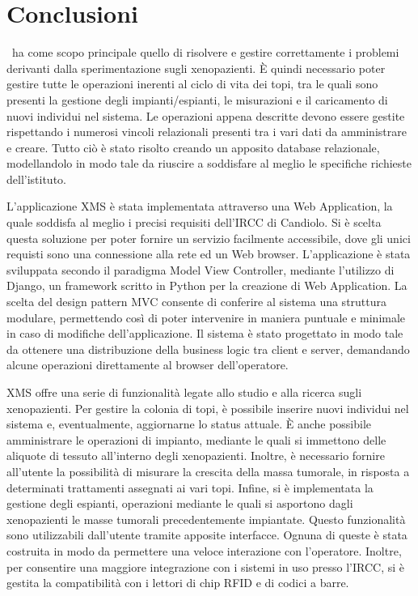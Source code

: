 \chapter{Conclusioni}\label{chap:xenoconcl}

\Xeno\ ha come scopo principale quello di risolvere e gestire correttamente i problemi derivanti dalla sperimentazione sugli xenopazienti. \`E quindi necessario poter gestire tutte le operazioni inerenti al ciclo di vita dei topi, tra le quali sono presenti la gestione degli impianti/espianti, le misurazioni e il caricamento di nuovi individui nel sistema. Le operazioni appena descritte devono essere gestite rispettando i numerosi vincoli relazionali presenti tra i vari dati da amministrare e creare. Tutto ci\`o \`e stato risolto creando un apposito database relazionale, modellandolo in modo tale da riuscire a soddisfare al meglio le specifiche richieste dell'istituto.

L'applicazione XMS \`e stata implementata attraverso una Web Application, la quale soddisfa al meglio i precisi requisiti dell'IRCC di Candiolo. Si \`e scelta questa soluzione per poter fornire un servizio facilmente accessibile, dove gli unici requisti sono una connessione alla rete ed un Web browser. L'applicazione \`e stata sviluppata secondo il paradigma Model View Controller, mediante l'utilizzo di Django, un framework scritto in Python per la creazione di Web Application. La scelta del design pattern MVC consente di conferire al sistema una struttura modulare, permettendo cos\`i di poter intervenire in maniera puntuale e minimale in caso di modifiche dell'applicazione. Il sistema \`e stato progettato in modo tale da ottenere una distribuzione della business logic tra client e server, demandando alcune operazioni direttamente al browser dell'operatore. 

XMS offre una serie di funzionalit\`a legate allo studio e alla ricerca sugli xenopazienti. Per gestire la colonia di topi, \`e possibile inserire nuovi individui nel sistema e, eventualmente, aggiornarne lo status attuale. \`E anche possibile amministrare le operazioni di impianto, mediante le quali si immettono delle aliquote di tessuto all'interno degli xenopazienti. Inoltre, \`e necessario fornire all'utente la possibilit\`a di misurare la crescita della massa tumorale, in risposta a determinati trattamenti assegnati ai vari topi. Infine, si \`e implementata la gestione degli espianti, operazioni mediante le quali si asportono dagli xenopazienti le masse tumorali precedentemente impiantate. Questo funzionalit\`a sono utilizzabili dall'utente tramite apposite interfacce. Ognuna di queste \`e stata costruita in modo da permettere una veloce interazione con l'operatore. Inoltre, per consentire una maggiore integrazione con i sistemi in uso presso l'IRCC, si \`e gestita la compatibilit\`a con i lettori di chip RFID e di codici a barre. 


